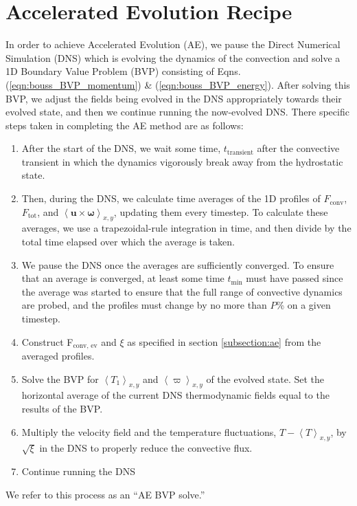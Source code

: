 \documentclass[aps, pre, onecolumn, nofootinbib, notitlepage, groupedaddress, amsfonts, amssymb, amsmath, longbibliography]{revtex4-1}
\newcommand{\angles}[1]{\ensuremath{\left\langle #1 \right\rangle}}
\begin{document}
\section{Accelerated Evolution Recipe}
\label{appendix:recipe}
In order to achieve Accelerated Evolution (AE), we pause the Direct Numerical Simulation (DNS)
which is evolving the dynamics of the convection and solve a 1D Boundary Value Problem (BVP)
consisting of Eqns. (\ref{eqn:bouss_BVP_momentum}) \& (\ref{eqn:bouss_BVP_energy}).
After solving this BVP, we adjust the fields being evolved in the DNS appropriately
towards their evolved state, and then we continue running the now-evolved DNS.
There specific steps taken in completing the AE method are as follows:
\begin{enumerate}
\item After the start of the DNS, we wait some time, $t_{\text{transient}}$ after
the convective transient in which the dynamics vigorously break away from the hydrostatic
state.
\item Then, during the DNS, we calculate time averages of the 1D profiles of
$F_{\text{conv}}$, $F_{\text{tot}}$, 
and $\angles{\bm{u} \times \bm{\omega}}_{x,y}$, updating them every timestep.  
To calculate these
averages, we use a trapezoidal-rule integration in time, and then divide by the
total time elapsed over which the average is taken. 
\item We pause the DNS once the averages are sufficiently converged. 
To ensure that an average is converged, at
least some time $t_{\text{min}}$ must have passed since the average was started to
ensure that the full range of convective dynamics are probed, and
the profiles must change by no more than $P$\% on a given timestep.
\item Construct F$_\text{conv, ev}$ and $\xi$ as specified in section \ref{subsection:ae}
from the averaged profiles.
\item Solve the BVP for $\angles{T_1}_{x,y}$ and $\angles{\varpi}_{x,y}$ of the
evolved state.  Set the horizontal average of the current DNS thermodynamic fields
equal to the results of the BVP.
\item Multiply the velocity field and the temperature fluctuations, $T - \angles{T}_{x,y}$,
by $\sqrt{\xi}$ in the DNS to properly reduce the convective flux.
\item Continue running the DNS
\end{enumerate}
We refer to this process as an ``AE BVP solve.''
\end{document}
